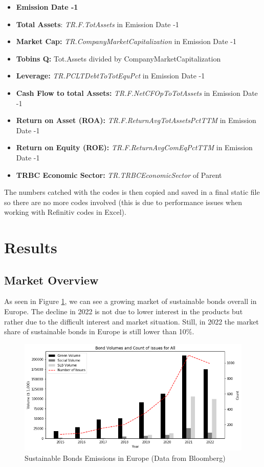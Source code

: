\documentclass[12pt, a4paper]{article}
\begin{document}
\begin{itemize}
    \item \textbf{Emission Date -1}
    \item \textbf{Total Assets}: \textit{TR.F.TotAssets} in Emission Date -1
    \item \textbf{Market Cap:} \textit{TR.CompanyMarketCapitalization} in Emission Date -1
    \item \textbf{Tobins Q: }Tot.Assets divided by CompanyMarketCapitalization
    \item \textbf{Leverage:} \textit{TR.PCLTDebtToTotEquPct} in Emission Date -1
    \item \textbf{Cash Flow to total Assets:} \textit{TR.F.NetCFOpToTotAssets} in Emission Date -1
    \item \textbf{Return on Asset (ROA):} \textit{TR.F.ReturnAvgTotAssetsPctTTM} in Emission Date -1
    \item \textbf{Return on Equity (ROE):} \textit{TR.F.ReturnAvgComEqPctTTM} in Emission Date -1
    \item \textbf{TRBC Economic Sector:} \textit{TR.TRBCEconomicSector} of Parent
    
\end{itemize}

The numbers catched with the codes is then copied and saved in a final static file so there are no more codes involved (this is due to performance issues when working with Refinitiv codes in Excel).

\section{Results}
\subsection{Market Overview}
As seen in Figure \ref{fig:market}, we can see a growing market of sustainable bonds overall in Europe. The decline in 2022 is not due to lower interest in the products but rather due to the difficult interest and market situation. Still, in 2022 the market share of sustainable bonds in Europe is still lower than 10\%. 
\begin{figure}[H]
    \centering
    \includegraphics[width=1\linewidth]{VolumeCount.png}
    \caption{Sustainable Bonds Emissions in Europe (Data from Bloomberg)}
\label{fig:market}
\end{figure}
\end{document}
